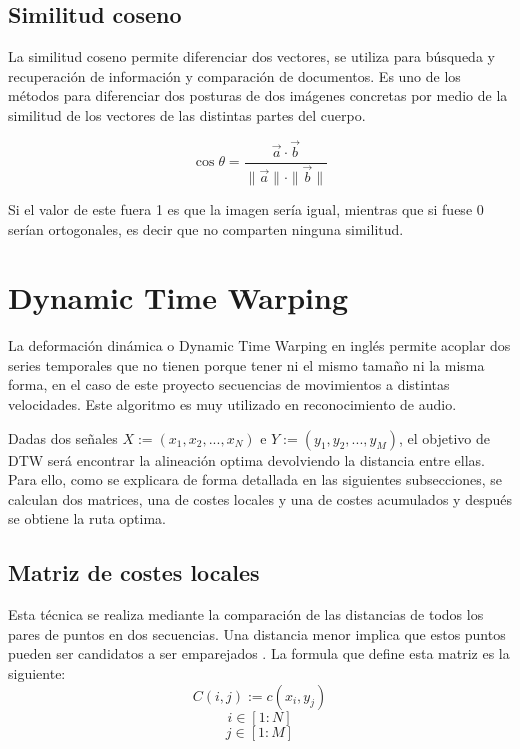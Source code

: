 \subsection{Similitud coseno}
La similitud coseno permite diferenciar dos vectores, se utiliza para búsqueda y recuperación de información y comparación de documentos.
Es uno de los métodos para diferenciar dos posturas de dos imágenes concretas por medio de la similitud de los vectores de las distintas partes del cuerpo.

\begin{equation}
	\cos \theta = \frac{\vec{a} \cdot \vec{b}}{\lVert \vec{a} \lVert \cdot \lVert \vec{b} \lVert}
\end{equation}

Si el valor de este fuera 1 es que la imagen sería igual, mientras que si fuese 0 serían ortogonales, es decir que no comparten ninguna similitud.

\section{Dynamic Time Warping}
\label{dtw}
La deformación dinámica o Dynamic Time Warping en inglés permite acoplar dos series temporales que no tienen porque tener ni el mismo tamaño ni la misma forma, en el caso de este proyecto secuencias de movimientos a distintas velocidades. Este algoritmo es muy utilizado en reconocimiento de audio.


Dadas dos señales $X:=(x_1, x_2, ..., x_N)$ e $Y:=(y_1, y_2, ..., y_M)$, el objetivo de DTW será encontrar la alineación optima devolviendo la distancia entre ellas. Para ello, como se explicara de forma detallada en las siguientes subsecciones, se calculan dos matrices, una de costes locales y una de costes acumulados y después se obtiene la ruta optima.

\subsection{Matriz de costes locales}
Esta técnica se realiza mediante la comparación de las distancias de todos los pares de puntos en dos secuencias. Una distancia menor implica que estos puntos pueden ser candidatos a ser emparejados \cite{dwt:dwtdescription}.  La formula que define esta matriz es la siguiente:
\begin{equation}
	C(i, j) := c(x_i, y_j)
\end{equation}
\[i \in [1:N]\]
\[j \in [1:M]\]

